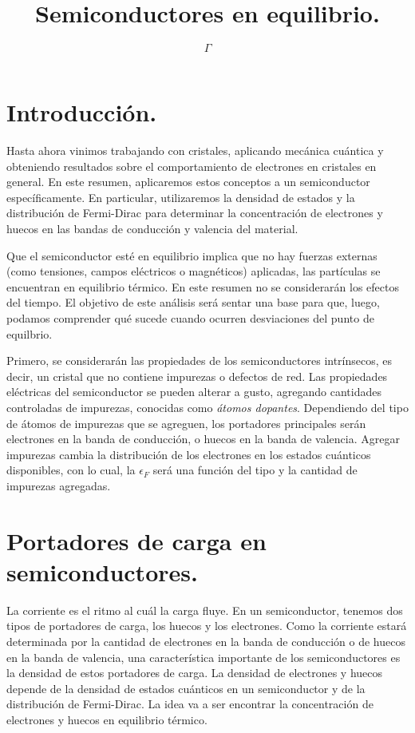 \documentclass[12pt,a4paper]{article}
\begin{document}
\title{Semiconductores en equilibrio.}

\author{$\Gamma$}

\maketitle

\section{Introducción.}

Hasta ahora vinimos trabajando con cristales, aplicando mecánica cuántica y obteniendo resultados sobre el comportamiento de electrones en cristales en general. En este resumen, aplicaremos estos conceptos a un semiconductor específicamente. En particular, utilizaremos la densidad de estados y la distribución de Fermi-Dirac para determinar la concentración de electrones y huecos en las bandas de conducción y valencia del material.

Que el semiconductor esté en equilibrio implica que no hay fuerzas externas (como tensiones, campos eléctricos o magnéticos) aplicadas, las partículas se encuentran en equilibrio térmico. En este resumen no se considerarán los efectos del tiempo. El objetivo de este análisis será sentar una base para que, luego, podamos comprender qué sucede cuando ocurren desviaciones del punto de equilbrio.

Primero, se considerarán las propiedades de los semiconductores intrínsecos, es decir, un cristal que no contiene impurezas o defectos de red. Las propiedades eléctricas del semiconductor se pueden alterar a gusto, agregando cantidades controladas de impurezas, conocidas como \emph{átomos dopantes}. Dependiendo del tipo de átomos de impurezas que se agreguen, los portadores principales serán electrones en la banda de conducción, o huecos en la banda de valencia. Agregar impurezas cambia la distribución de los electrones en los estados cuánticos disponibles, con lo cual, la $\epsilon _{F}$ será una función del tipo y la cantidad de impurezas agregadas.

\section{Portadores de carga en semiconductores.}

La corriente es el ritmo al cuál la carga fluye. En un semiconductor, tenemos dos tipos de portadores de carga, los huecos y los electrones. Como la corriente estará determinada por la cantidad de electrones en la banda de conducción o de huecos en la banda de valencia, una característica importante de los semiconductores es la densidad de estos portadores de carga. La densidad de electrones y huecos depende de la densidad de estados cuánticos en un semiconductor y de la distribución de Fermi-Dirac. La idea va a ser encontrar la concentración de electrones y huecos en equilibrio térmico.
\end{document}
